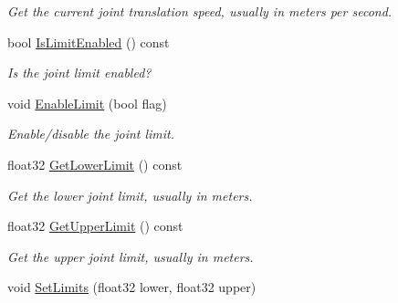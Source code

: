 \begin{DoxyCompactItemize}
\begin{DoxyCompactList}\small\item\em Get the current joint translation speed, usually in meters per second. \end{DoxyCompactList}\item 
\hypertarget{classb2_prismatic_joint_afb109fd7f3efbf44eae4b7961169bf9f}{bool \hyperlink{classb2_prismatic_joint_afb109fd7f3efbf44eae4b7961169bf9f}{Is\-Limit\-Enabled} () const }\label{classb2_prismatic_joint_afb109fd7f3efbf44eae4b7961169bf9f}

\begin{DoxyCompactList}\small\item\em Is the joint limit enabled? \end{DoxyCompactList}\item 
\hypertarget{classb2_prismatic_joint_a6d419afe7bd4b0e36d2e4607df7f79f2}{void \hyperlink{classb2_prismatic_joint_a6d419afe7bd4b0e36d2e4607df7f79f2}{Enable\-Limit} (bool flag)}\label{classb2_prismatic_joint_a6d419afe7bd4b0e36d2e4607df7f79f2}

\begin{DoxyCompactList}\small\item\em Enable/disable the joint limit. \end{DoxyCompactList}\item 
\hypertarget{classb2_prismatic_joint_ad58727abc63a820e6d93983408a9508b}{float32 \hyperlink{classb2_prismatic_joint_ad58727abc63a820e6d93983408a9508b}{Get\-Lower\-Limit} () const }\label{classb2_prismatic_joint_ad58727abc63a820e6d93983408a9508b}

\begin{DoxyCompactList}\small\item\em Get the lower joint limit, usually in meters. \end{DoxyCompactList}\item 
\hypertarget{classb2_prismatic_joint_ac72bdcf5108d474d3f11e86773a9a471}{float32 \hyperlink{classb2_prismatic_joint_ac72bdcf5108d474d3f11e86773a9a471}{Get\-Upper\-Limit} () const }\label{classb2_prismatic_joint_ac72bdcf5108d474d3f11e86773a9a471}

\begin{DoxyCompactList}\small\item\em Get the upper joint limit, usually in meters. \end{DoxyCompactList}\item 
\hypertarget{classb2_prismatic_joint_a82a220e6d5a212c1924882e0855b0bef}{void \hyperlink{classb2_prismatic_joint_a82a220e6d5a212c1924882e0855b0bef}{Set\-Limits} (float32 lower, float32 upper)}\label{classb2_prismatic_joint_a82a220e6d5a212c1924882e0855b0bef}


\end{DoxyCompactItemize}
